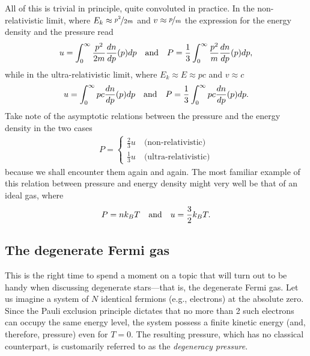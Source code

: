All of this is trivial in principle, quite convoluted in practice. In the non-relativistic
limit, where $E_k \approx \nicefrac{p^2}{2m}$ and $v \approx \nicefrac{p}{m}$
the expression for the energy density and the pressure read
\begin{align*}
  u = \int_0^\infty \frac{p^2}{2m} \frac{dn}{dp}(p) dp \quad \text{and} \quad
  P = \frac{1}{3} \int_0^\infty \frac{p^2}{m} \frac{dn}{dp}(p) dp,
\end{align*}
while in the ultra-relativistic limit, where $E_k \approx E \approx pc$ and $v \approx c$
\begin{align*}
  u = \int_0^\infty pc \frac{dn}{dp}(p) dp \quad \text{and} \quad
  P = \frac{1}{3} \int_0^\infty pc \frac{dn}{dp}(p) dp.
\end{align*}
Take note of the asymptotic relations between the pressure and the energy
density in
the two cases
\begin{align}
  P =
  \begin{cases}
    \frac{2}{3} u \quad \text{(non-relativistic)}\\
    \frac{1}{3} u \quad \text{(ultra-relativistic)}
  \end{cases}
\end{align}
because we shall encounter them again and again. The most familiar example of this
relation between pressure and energy density might very well be that of an ideal
gas, where
\begin{align*}
  P = nk_B T \quad\text{and}\quad u = \frac{3}{2} k_B T.
\end{align*}



\subsection{The degenerate Fermi gas}
\label{sec:fermi_gas}

This is the right time to spend a moment on a topic that will turn out to be handy
when discussing degenerate stars---that is, the degenerate Fermi gas.
Let us imagine a system of $N$ identical fermions (e.g., electrons) at the absolute
zero. Since the Pauli exclusion principle dictates that no more than 2 such electrons
can occupy the same energy level, the system possess a finite kinetic energy (and,
therefore, pressure) even for $T = 0$. The resulting pressure, which has no classical
counterpart, is customarily referred to as the \emph{degeneracy pressure}.

